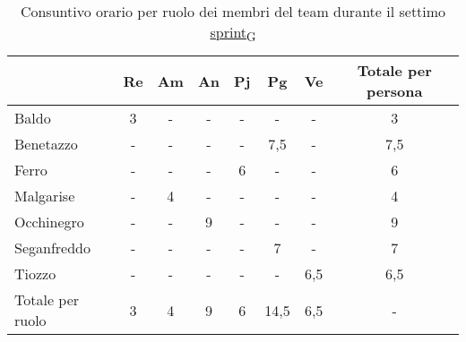 \begin{table}[!h]
    \centering
    \begin{tabular}{ | l | c | c | c | c | c | c | c | }
        \hline
        \textbf{} & \textbf{Re} & \textbf{Am} &\textbf{An} & \textbf{Pj} & \textbf{Pg} & \textbf{Ve} & \textbf{Totale per persona} \\
        \hline
        Baldo            &  3   &  -   &  -   &  -   &  -   &  -   &  3   \\
        Benetazzo        &  -   &  -   &  -   &  -   &  7,5 &  -   &  7,5 \\
        Ferro            &  -   &  -   &  -   &  6   &  -   &  -   &  6   \\
        Malgarise        &  -   &  4   &  -   &  -   &  -   &  -   &  4   \\
        Occhinegro       &  -   &  -   &  9   &  -   &  -   &  -   &  9   \\
        Seganfreddo      &  -   &  -   &  -   &  -   &  7   &  -   &  7   \\
        Tiozzo           &  -   &  -   &  -   &  -   &  -   &  6,5 &  6,5 \\
        \hline
        Totale per ruolo &  3   &  4   &  9   &  6   & 14,5 &  6,5  &  -  \\
        \hline
    \end{tabular}
    \caption{Consuntivo orario per ruolo dei membri del team durante il settimo \href{https://7last.github.io/docs/pb/documentazione-interna/glossario\#sprint}{sprint\textsubscript{G}}}
\end{table}

